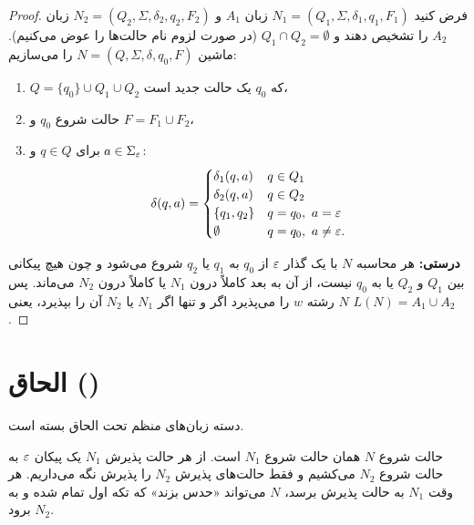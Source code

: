 \begin{proof}
فرض کنید $N_1=(Q_1,\Sigma,\delta_1,q_1,F_1)$ زبان $A_1$ و $N_2=(Q_2,\Sigma,\delta_2,q_2,F_2)$ زبان $A_2$ را تشخیص دهند و $Q_1\cap Q_2=\emptyset$ (در صورت لزوم نام حالت‌ها را عوض می‌کنیم). ماشین $N=(Q,\Sigma,\delta,q_0,F)$ را می‌سازیم:
\begin{enumerate}
\item $Q=\{q_0\}\cup Q_1\cup Q_2$ که $q_0$ یک حالت جدید است،
\item حالت شروع $q_0$ و $F=F_1\cup F_2$،
\item برای $q\in Q$ و $a\in\Sigma_\varepsilon$:
\[\delta(q,a)=\begin{cases}
\delta_1(q,a) & q\in Q_1\\
\delta_2(q,a) & q\in Q_2\\
\{q_1,q_2\} & q=q_0,\ a=\varepsilon\\
\emptyset & q=q_0,\ a\neq\varepsilon.
\end{cases}\]
\end{enumerate}
\textbf{درستی:} هر محاسبه $N$ با یک گذار $\varepsilon$ از $q_0$ به $q_1$ یا $q_2$ شروع می‌شود و چون هیچ پیکانی بین $Q_1$ و $Q_2$ یا به $q_0$ نیست، از آن به بعد کاملاً درون $N_1$ یا کاملاً درون $N_2$ می‌ماند. پس $N$ رشته $w$ را می‌پذیرد اگر و تنها اگر $N_1$ یا $N_2$ آن را بپذیرد، یعنی $L(N)=A_1\cup A_2$.
\end{proof}

\section{الحاق ()}

\begin{theorem}
دسته زبان‌های منظم تحت الحاق بسته است.
\end{theorem}

\begin{proofidea}
حالت شروع $N$ همان حالت شروع $N_1$ است. از هر حالت پذیرش $N_1$ یک پیکان $\varepsilon$ به حالت شروع $N_2$ می‌کشیم و فقط حالت‌های پذیرش $N_2$ را پذیرش نگه می‌داریم. هر وقت $N_1$ به حالت پذیرش برسد، $N$ می‌تواند «حدس بزند» که تکه اول تمام شده و به $N_2$ برود.
\begin{ltrfig}
\end{ltrfig}
\end{proofidea}


